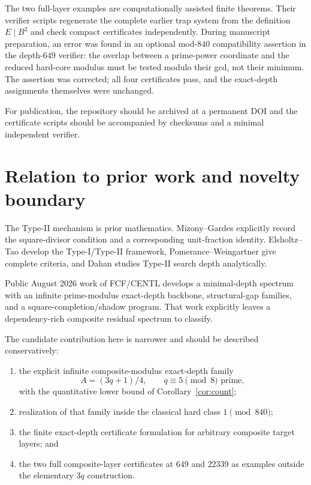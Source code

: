 \documentclass[11pt]{article}
\theoremstyle{definition}
\begin{document}
The two full-layer examples are computationally assisted finite theorems.  Their verifier scripts regenerate the complete earlier trap system from the definition $E\mid B^2$ and check compact certificates independently.  During manuscript preparation, an error was found in an optional mod-$840$ compatibility assertion in the depth-$649$ verifier: the overlap between a prime-power coordinate and the reduced hard-core modulus must be tested modulo their gcd, not their minimum.  The assertion was corrected; all four certificates pass, and the exact-depth assignments themselves were unchanged.

For publication, the repository should be archived at a permanent DOI and the certificate scripts should be accompanied by checksums and a minimal independent verifier.

\section{Relation to prior work and novelty boundary}
The Type-II mechanism is prior mathematics.  Mizony--Gardes explicitly record the square-divisor condition and a corresponding unit-fraction identity.  Elsholtz--Tao develop the Type-I/Type-II framework, Pomerance--Weingartner give complete criteria, and Dahan studies Type-II search depth analytically.

Public August 2026 work of FCF/CENTL develops a minimal-depth spectrum with an infinite prime-modulus exact-depth backbone, structural-gap families, and a square-completion/shadow program.  That work explicitly leaves a dependency-rich composite residual spectrum to classify.

The candidate contribution here is narrower and should be described conservatively:
\begin{enumerate}
\item the explicit infinite composite-modulus exact-depth family
\[
A=(3q+1)/4,\qquad q\equiv5\pmod8\text{ prime},
\]
with the quantitative lower bound of Corollary~\ref{cor:count};
\item realization of that family inside the classical hard class $1\pmod{840}$;
\item the finite exact-depth certificate formulation for arbitrary composite target layers; and
\item the two full composite-layer certificates at $649$ and $22339$ as examples outside the elementary $3q$ construction.
\end{enumerate}
\end{document}
